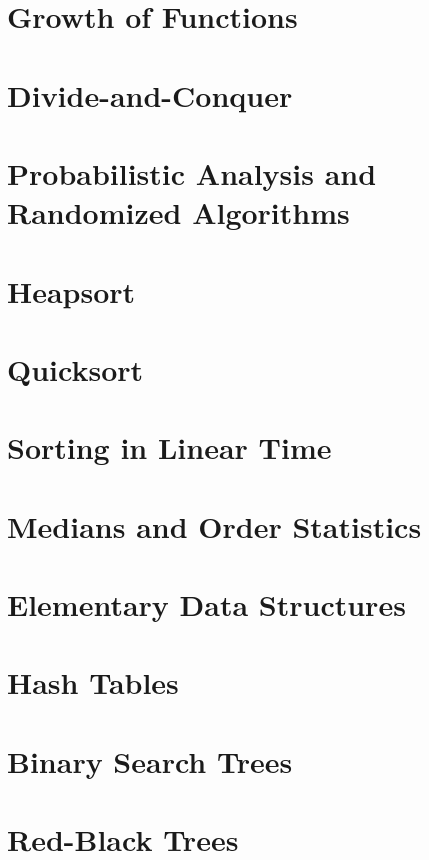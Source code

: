 \documentclass{book}
\begin{document}
\chapter{Growth of Functions}

\chapter{Divide-and-Conquer}

\chapter{Probabilistic Analysis and Randomized Algorithms}

\chapter{Heapsort}

\chapter{Quicksort}

\chapter{Sorting in Linear Time}

\chapter{Medians and Order Statistics}

\chapter{Elementary Data Structures}

\chapter{Hash Tables}

\chapter{Binary Search Trees}

\chapter{Red-Black Trees}
\end{document}
